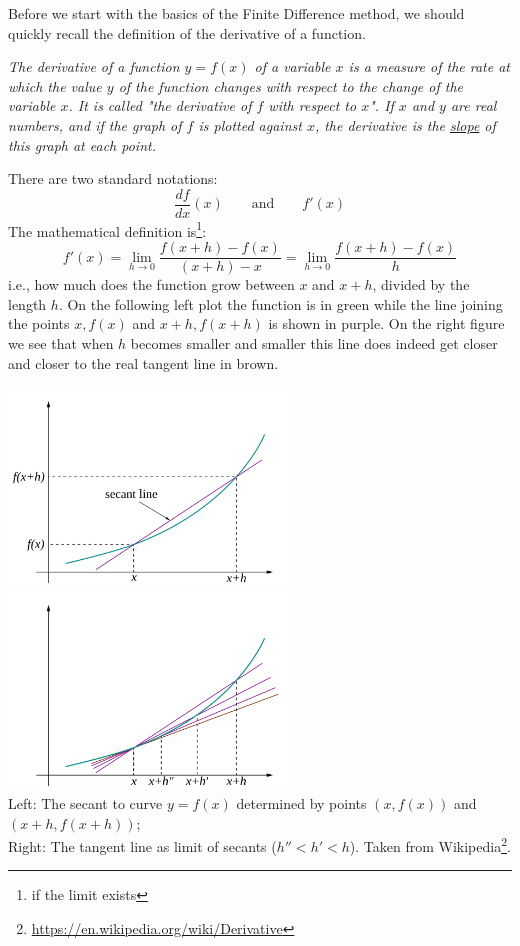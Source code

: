 Before we start with the basics of the Finite Difference method, we should quickly recall the definition 
of the derivative of a function. 

\begin{center}
{\sl 
The derivative of a function $y=f(x)$ of a variable $x$ is a measure of the rate at which the value $y$ 
of the function changes with respect to the change of the variable $x$. It is called "the derivative of $f$ 
with respect to $x$". If $x$ and $y$ are real numbers, and if the graph of $f$ is plotted against $x$, the derivative 
is the \underline{slope} of this graph at each point. 
}
\end{center}

\noindent There are two standard notations:
\begin{equation}
\frac{df}{dx}(x) \qquad \text{and} \qquad f'(x)
\end{equation}
The mathematical definition is\footnote{if the limit exists}:
\begin{equation}
\boxed{
f'(x)
=\lim_{h\rightarrow 0} \frac{f(x+h)-f(x)}{(x+h)-x} 
=\lim_{h\rightarrow 0} \frac{f(x+h)-f(x)}{h} 
}
\end{equation}
i.e., how much does the function grow between $x$ and $x+h$, divided by the length $h$.
On the following left plot the function is in green while the line joining the points
$x,f(x)$ and $x+h,f(x+h)$ is shown in purple. On the right figure we see that 
when $h$ becomes smaller and smaller this line does indeed get closer and closer 
to the real tangent line in brown.

\begin{center}
\includegraphics[width=7.4cm]{images/derivative/der2}
\includegraphics[width=7.4cm]{images/derivative/der1}\\
{\captionfont 
Left: The secant to curve $y=f(x)$ determined by points $(x,f(x))$ and $(x+h, f(x+h))$;\\
Right: The tangent line as limit of secants ($h''<h'<h$).
Taken from Wikipedia\footnote{\url{https://en.wikipedia.org/wiki/Derivative}}.
}
\end{center}

